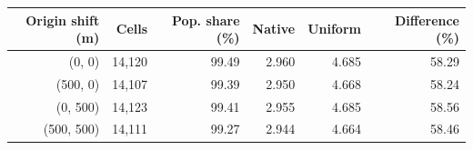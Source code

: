 \begin{tabular}{rrrrrr}\toprule
Origin shift (m) & Cells & Pop. share (\%) & Native & Uniform & Difference (\%)\\\midrule
(0, 0) & 14,120 & 99.49 & 2.960 & 4.685 & 58.29\\
(500, 0) & 14,107 & 99.39 & 2.950 & 4.668 & 58.24\\
(0, 500) & 14,123 & 99.41 & 2.955 & 4.685 & 58.56\\
(500, 500) & 14,111 & 99.27 & 2.944 & 4.664 & 58.46\\
\bottomrule\end{tabular}
